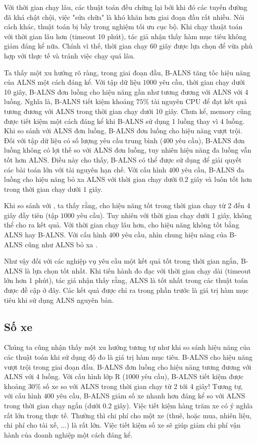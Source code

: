Với thời gian chạy lâu, các thuật toán đều chững lại bởi khi đó các tuyến đường đã khá chật chội, việc "sửa chữa" là khó khăn hơn giai đoạn đầu rất nhiều. Nói cách khác, thuật toán bị bẫy trong nghiệm tối ưu cục bộ. Khi chạy thuật toán với thời gian lâu hơn (timeout 10 phút), tác giả nhận thấy hàm mục tiêu không giảm đáng kể nữa. Chính vì thế, thời gian chạy 60 giây được lựa chọn để vừa phù hợp với thực tế và tránh việc chạy quá lâu.

Ta thấy một xu hướng rõ ràng, trong giai đoạn đầu, B-ALNS tăng tốc hiệu năng của ALNS một cách đáng kể. Với tập dữ liệu $1000$ yêu cầu, thời gian chạy dưới 10 giây, B-ALNS đơn luồng cho hiệu năng gần như tương đương với ALNS với 4 luồng. Nghĩa là, B-ALNS tiết kiệm khoảng $75\%$ tài nguyên CPU để đạt kết quả tương đương với ALNS trong thời gian chạy dưới 10 giây. Chưa kể, memory cũng được tiết kiệm một cách đáng kể khi B-ALNS sử dụng 1 luồng thay vì 4 luồng. Khi so sánh với ALNS đơn luồng, B-ALNS đơn luồng cho hiệu năng vượt trội. Đối với tập dữ liệu có số lượng yêu cầu trung bình ($400$ yêu cầu), B-ALNS đơn luồng không có lợi thế so với ALNS đơn luồng, tuy nhiên hiệu năng đa luồng vẫn tốt hơn ALNS. Điều này cho thấy, B-ALNS có thể được sử dụng để giải quyết các bài toán lớn với tài nguyên hạn chế. Với cấu hình $400$ yêu cầu, B-ALNS đa luồng cho hiệu năng bỏ xa ALNS với thời gian chạy dưới $0.2$ giây và luôn tốt hơn trong thời gian chạy dưới $1$ giây. 

Khi so sánh với , ta thấy rằng,  cho hiệu năng tốt trong thời gian chạy từ 2 đến 4 giây đầy tiên (tập $1000$ yêu cầu). Tuy nhiên với thời gian chạy dưới 1 giây,  không thể cho ra kết quả. Với thời gian chạy lâu hơn,  cho hiệu năng không tốt bằng ALNS hay B-ALNS. Với cấu hình $400$ yêu cầu, nhìn chung hiệu năng của B-ALNS cũng như ALNS bỏ xa .

Như vậy đối với các nghiệp vụ yêu cầu một kết quả tốt trong thời gian ngắn, B-ALNS là lựa chọn tốt nhất. Khi tiến hành đo đạc với thời gian chạy dài (timeout lớn hơn 1 phút), tác giả nhận thấy rằng, ALNS là tốt nhất trong các thuật toán được đề cập ở đây. Các kết quả được chỉ ra trong phần trước là giá trị hàm mục tiêu khi sử dụng ALNS nguyên bản.

\subsection{Số xe}

Chúng ta cũng nhận thấy một xu hướng tương tự như khi so sánh hiệu năng của các thuật toán khi sử dụng độ đo là giá trị hàm mục tiêu. B-ALNS cho hiệu năng vượt trội trong giai đoạn đầu. B-ALNS đơn luồng cho hiệu năng tương đương với ALNS với 4 luồng. Với cấu hình lớp R ($1000$ yêu cầu), B-ALNS tiết kiệm được khoảng $30\%$ số xe so với ALNS trong thời gian chạy từ 2 tới 4 giây! Tương tự, với cấu hình $400$ yêu cầu, B-ALNS giảm số xe nhanh hơn đáng kể so với ALNS trong thời gian chạy ngắn (dưới $0.2$ giây).  Việc tiết kiệm hàng trăm xe có ý nghĩa rất lớn trong thực tế. Thường thì chi phí cho một xe (thuê, hoặc mua, nhiên liệu, chi phí cho tài xế, ...) là rất lớn. Việc tiết kiệm số xe sẽ giúp giảm chi phí vận hành của doanh nghiệp một cách đáng kể. 

